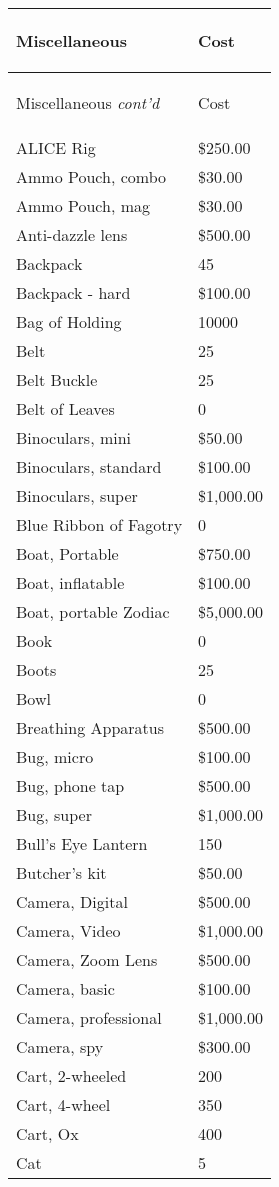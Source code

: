 \documentclass[twoside]{book}
\begin{document}
\begin{longtable}{p{1.25in}l} 
  Miscellaneous& \begin{turn}{70}{Cost}\end{turn}
          \\
  \hline
  \hline
  \endfirsthead
  Miscellaneous \textit{cont'd}
        & \begin{turn}{70}{Cost}\end{turn}
           \\
  \hline
  \endhead
\raggedright ALICE Rig & \$250.00 \tabularnewline
      \raggedright Ammo Pouch, combo & \$30.00 \tabularnewline
      \raggedright Ammo Pouch, mag & \$30.00 \tabularnewline
      \raggedright Anti-dazzle lens & \$500.00 \tabularnewline
      \raggedright Backpack & 45 \tabularnewline
      \raggedright Backpack - hard & \$100.00 \tabularnewline
      \raggedright Bag of Holding & 10000 \tabularnewline
      \raggedright Belt & 25 \tabularnewline
      \raggedright Belt Buckle & 25 \tabularnewline
      \raggedright Belt of Leaves & 0 \tabularnewline
      \raggedright Binoculars, mini & \$50.00 \tabularnewline
      \raggedright Binoculars, standard & \$100.00 \tabularnewline
      \raggedright Binoculars, super & \$1,000.00 \tabularnewline
      \raggedright Blue Ribbon of Fagotry & 0 \tabularnewline
      \raggedright Boat, Portable & \$750.00 \tabularnewline
      \raggedright Boat, inflatable & \$100.00 \tabularnewline
      \raggedright Boat, portable Zodiac & \$5,000.00 \tabularnewline
      \raggedright Book & 0 \tabularnewline
      \raggedright Boots & 25 \tabularnewline
      \raggedright Bowl & 0 \tabularnewline
      \raggedright Breathing Apparatus & \$500.00 \tabularnewline
      \raggedright Bug, micro & \$100.00 \tabularnewline
      \raggedright Bug, phone tap & \$500.00 \tabularnewline
      \raggedright Bug, super & \$1,000.00 \tabularnewline
      \raggedright Bull's Eye Lantern
           & 150 \tabularnewline
      \raggedright Butcher's kit & \$50.00 \tabularnewline
      \raggedright Camera, Digital & \$500.00 \tabularnewline
      \raggedright Camera, Video & \$1,000.00 \tabularnewline
      \raggedright Camera, Zoom Lens & \$500.00 \tabularnewline
      \raggedright Camera, basic & \$100.00 \tabularnewline
      \raggedright Camera, professional & \$1,000.00 \tabularnewline
      \raggedright Camera, spy & \$300.00 \tabularnewline
      \raggedright Cart, 2-wheeled & 200 \tabularnewline
      \raggedright Cart, 4-wheel & 350 \tabularnewline
      \raggedright Cart, Ox & 400 \tabularnewline
      \raggedright Cat & 5 \tabularnewline

\end{longtable}
\end{document}
